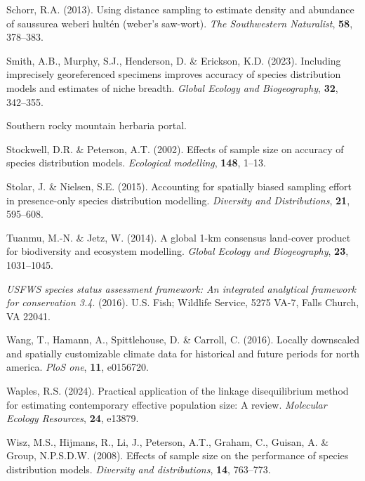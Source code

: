 \documentclass[
]{article}
\newlength{\cslhangindent}
\newlength{\cslentryspacingunit} %
\newenvironment{CSLReferences}[2] %
 {%
  \setlength{\parindent}{0pt}
  \ifodd #1
  \let\oldpar\par
  \def\par{\hangindent=\cslhangindent\oldpar}
  \fi
  \setlength{\parskip}{#2\cslentryspacingunit}
 }%
 {}
\begin{document}
\begin{CSLReferences}{1}{0}
\leavevmode{}%
Schorr, R.A. (2013). Using distance sampling to estimate density and
abundance of saussurea weberi hult{é}n (weber's saw-wort). \emph{The
Southwestern Naturalist}, \textbf{58}, 378--383.

\leavevmode{}%
Smith, A.B., Murphy, S.J., Henderson, D. \& Erickson, K.D. (2023).
Including imprecisely georeferenced specimens improves accuracy of
species distribution models and estimates of niche breadth. \emph{Global
Ecology and Biogeography}, \textbf{32}, 342--355.

\leavevmode{}%
Southern rocky mountain herbaria portal.

\leavevmode{}%
Stockwell, D.R. \& Peterson, A.T. (2002). Effects of sample size on
accuracy of species distribution models. \emph{Ecological modelling},
\textbf{148}, 1--13.

\leavevmode{}%
Stolar, J. \& Nielsen, S.E. (2015). Accounting for spatially biased
sampling effort in presence-only species distribution modelling.
\emph{Diversity and Distributions}, \textbf{21}, 595--608.

\leavevmode{}%
Tuanmu, M.-N. \& Jetz, W. (2014). A global 1-km consensus land-cover
product for biodiversity and ecosystem modelling. \emph{Global Ecology
and Biogeography}, \textbf{23}, 1031--1045.

\leavevmode{}%
\emph{USFWS species status assessment framework: An integrated
analytical framework for conservation 3.4}. (2016). U.S. Fish; Wildlife
Service, 5275 VA-7, Falls Church, VA 22041.

\leavevmode{}%
Wang, T., Hamann, A., Spittlehouse, D. \& Carroll, C. (2016). Locally
downscaled and spatially customizable climate data for historical and
future periods for north america. \emph{PloS one}, \textbf{11},
e0156720.

\leavevmode{}%
Waples, R.S. (2024). Practical application of the linkage disequilibrium
method for estimating contemporary effective population size: A review.
\emph{Molecular Ecology Resources}, \textbf{24}, e13879.

\leavevmode{}%
Wisz, M.S., Hijmans, R., Li, J., Peterson, A.T., Graham, C., Guisan, A.
\& Group, N.P.S.D.W. (2008). Effects of sample size on the performance
of species distribution models. \emph{Diversity and distributions},
\textbf{14}, 763--773.


\end{CSLReferences}
\end{document}
